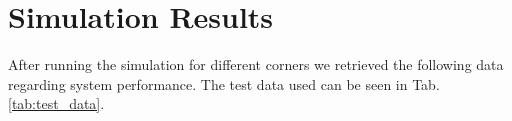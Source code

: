 \section{Simulation Results} \label{sec:simulation_results}





After running the simulation for different corners we retrieved the following data regarding system performance. The test data used can be seen in Tab. \ref{tab:test_data}.

